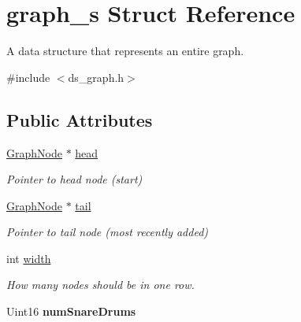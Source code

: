\hypertarget{structgraph__s}{}\section{graph\+\_\+s Struct Reference}
\label{structgraph__s}


A data structure that represents an entire graph.  




{\ttfamily \#include $<$ds\+\_\+graph.\+h$>$}

\subsection*{Public Attributes}
\begin{DoxyCompactItemize}
\item 
\mbox{\label{structgraph__s_a0d3056727913ba7008cfabef89101969}} 
\hyperlink{structgraphnode__s}{Graph\+Node} $\ast$ \hyperlink{structgraph__s_a0d3056727913ba7008cfabef89101969}{head}
\begin{DoxyCompactList}\small\item\em Pointer to head node (start) \end{DoxyCompactList}\item 
\mbox{\label{structgraph__s_abd61942b52cd5454ace79a4029233215}} 
\hyperlink{structgraphnode__s}{Graph\+Node} $\ast$ \hyperlink{structgraph__s_abd61942b52cd5454ace79a4029233215}{tail}
\begin{DoxyCompactList}\small\item\em Pointer to tail node (most recently added) \end{DoxyCompactList}\item 
\mbox{\label{structgraph__s_a3bcd4da7297c045e4bef045287dda45b}} 
int \hyperlink{structgraph__s_a3bcd4da7297c045e4bef045287dda45b}{width}
\begin{DoxyCompactList}\small\item\em How many nodes should be in one row. \end{DoxyCompactList}\item 
\mbox{\label{structgraph__s_a7e4856b461b7e0696c4368012490c40e}} 
Uint16 {\bfseries num\+Snare\+Drums}
\item 
\mbox{\label{structgraph__s_a7eb6417456c673dc03c8e94e6f02dc70}} 

\end{DoxyCompactItemize}
